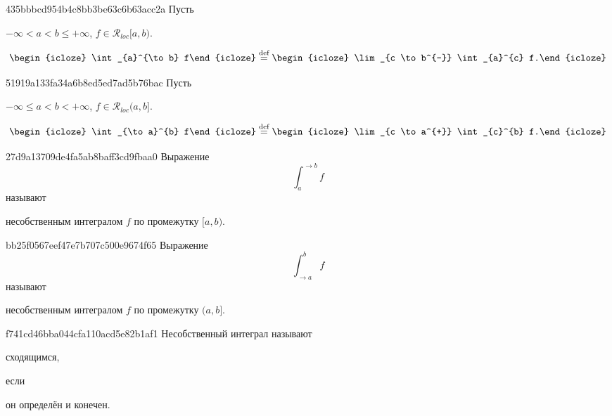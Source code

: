 \begin{note}{435bbbcd954b4c8bb3be63c6b63acc2a}
    Пусть \begin{icloze}{3}\({ -\infty < a < b \leqslant +\infty }\), \({ f \in \mathcal R_{loc}[a, b) }\).\end{icloze}
    \[
        \begin{icloze}{2}\int_{a}^{\to b} f\end{icloze} \overset{\text{def}}= \begin{icloze}{1}\lim_{c \to b^{-}} \int_{a}^{c} f.\end{icloze}
    \]
\end{note}

\begin{note}{51919a133fa34a6b8ed5ed7ad5b76bac}
    Пусть \begin{icloze}{3}\({ -\infty \leqslant a < b < +\infty }\), \({ f \in \mathcal R_{loc}(a, b] }\).\end{icloze}
    \[
        \begin{icloze}{2}\int_{\to a}^{b} f\end{icloze} \overset{\text{def}}= \begin{icloze}{1}\lim_{c \to a^{+}} \int_{c}^{b} f.\end{icloze}
    \]
\end{note}

\begin{note}{27d9a13709de4fa5ab8baff3cd9fbaa0}
    Выражение
    \[
        { \int_{a}^{\to b} f }
    \]
    называют \begin{icloze}{1}несобственным интегралом \({ f }\) по промежутку \({ [a, b) }\).\end{icloze}
\end{note}

\begin{note}{bb25f0567eef47e7b707c500e9674f65}
    Выражение
    \[
        { \int_{\to a}^{b} f }
    \]
    называют \begin{icloze}{1}несобственным интегралом \({ f }\) по промежутку \({ (a, b] }\).\end{icloze}
\end{note}

\begin{note}{f741cd46bba044cfa110acd5e82b1af1}
    Несобственный интеграл называют \begin{icloze}{2}сходящимся,\end{icloze} если \begin{icloze}{1}он определён и конечен.\end{icloze}
\end{note}

